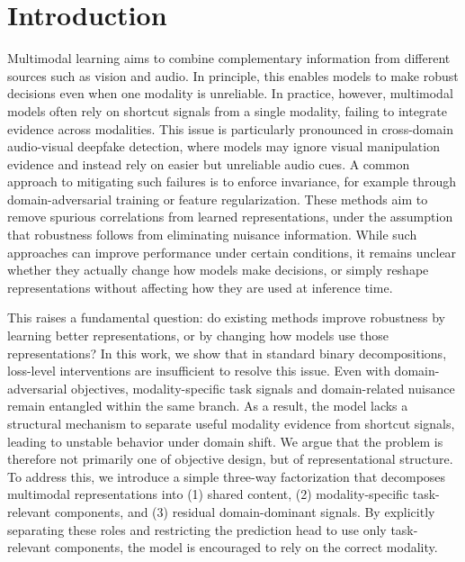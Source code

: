 \documentclass{article}
\begin{document}
\section{Introduction}
Multimodal learning aims to combine complementary information from different sources such as vision and audio. In principle, this enables models to make robust decisions even when one modality is unreliable. In practice, however, multimodal models often rely on shortcut signals from a single modality, failing to integrate evidence across modalities. This issue is particularly pronounced in cross-domain audio-visual deepfake detection, where models may ignore visual manipulation evidence and instead rely on easier but unreliable audio cues.
A common approach to mitigating such failures is to enforce invariance, for example through domain-adversarial training or feature regularization. These methods aim to remove spurious correlations from learned representations, under the assumption that robustness follows from eliminating nuisance information. While such approaches can improve performance under certain conditions, it remains unclear whether they actually change how models make decisions, or simply reshape representations without affecting how they are used at inference time.

This raises a fundamental question: do existing methods improve robustness by learning better representations, or by changing how models use those representations?
In this work, we show that in standard binary decompositions, loss-level interventions are insufficient to resolve this issue. Even with domain-adversarial objectives, modality-specific task signals and domain-related nuisance remain entangled within the same branch. As a result, the model lacks a structural mechanism to separate useful modality evidence from shortcut signals, leading to unstable behavior under domain shift.
We argue that the problem is therefore not primarily one of objective design, but of representational structure. To address this, we introduce a simple three-way factorization that decomposes multimodal representations into (1) shared content, (2) modality-specific task-relevant components, and (3) residual domain-dominant signals. By explicitly separating these roles and restricting the prediction head to use only task-relevant components, the model is encouraged to rely on the correct modality.
\end{document}
